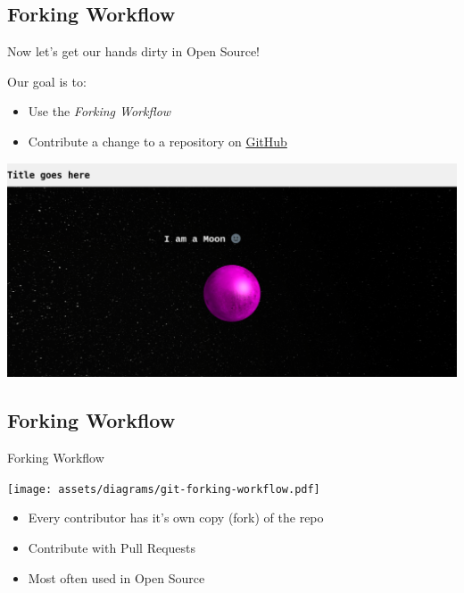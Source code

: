 \subsection{Forking Workflow}
\begin{frame}[fragile]
  \subslidetitle

  Now let's get our hands dirty in Open Source! \\
  \vspace{1em}

  Our goal is to:
  \begin{itemize}
    \item Use the \textit{Forking Workflow}
    \item Contribute a change to a repository on \href{https://github.com}{GitHub}
  \end{itemize}

  \centerline{\includegraphics[width=\textwidth]{../assets/images/gitmoon-colab.png}}

\end{frame}

\subsection{Forking Workflow}
\begin{frame}[fragile]
  \subslidetitle
  Forking Workflow
    \centerline{\texttt{[image: assets/diagrams/git-forking-workflow.pdf]}}

  \vspace{2em}
  \begin{itemize}
    \item Every contributor has it's own copy (fork) of the repo
    \item Contribute with Pull Requests
    \item Most often used in Open Source
  \end{itemize}

\end{frame}


